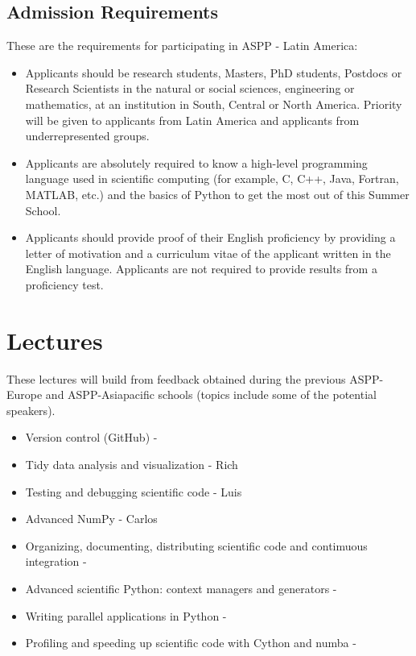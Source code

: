 \documentclass{article}[11pt]
\begin{document}
\subsection*{Admission Requirements}
These are the requirements for participating in ASPP - Latin America:
\begin{itemize}
    \item Applicants should be research students, Masters, PhD students, Postdocs or Research Scientists in the natural or social sciences, engineering or mathematics, at an institution in South, Central or North America. Priority will be given to applicants from Latin America and applicants from underrepresented groups.
    \item Applicants are absolutely required to know a high-level programming language used in scientific computing (for example, C, C++, Java, Fortran, MATLAB, etc.) and the basics of Python to get the most out of this Summer School.
    \item Applicants should provide proof of their English proficiency by providing a letter of motivation and a curriculum vitae of the applicant written in the English language. Applicants are not required to provide results from a proficiency test.  
\end{itemize}

\section*{Lectures }%

These lectures will build from feedback obtained during the previous 
ASPP-Europe and ASPP-Asiapacific schools (topics include some of the 
potential speakers).

\begin{itemize}
    \item Version control (GitHub) - 
    \item Tidy data analysis and visualization - Rich 
    \item Testing and debugging scientific code - Luis
    \item Advanced NumPy - Carlos
    \item Organizing, documenting, distributing  scientific code and 
    contimuous integration - 
    \item Advanced scientific Python: context managers and generators - 
    \item Writing parallel applications in Python - 
    \item Profiling and speeding up scientific code with Cython and numba - 
\end{itemize}
\end{document}
